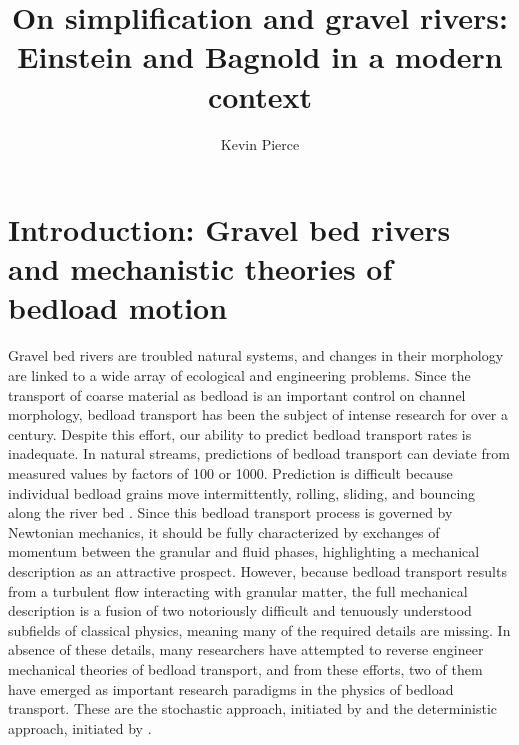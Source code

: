 \documentclass{article}
\begin{document}
\title{On simplification and gravel rivers: Einstein and Bagnold in a modern context}
\author{Kevin Pierce}
\maketitle


\section{Introduction: Gravel bed rivers and mechanistic theories of bedload motion}
Gravel bed rivers are troubled natural systems, and changes in their morphology are linked to a wide array of ecological and engineering problems.
Since the transport of coarse material as bedload is an important control on channel morphology, bedload transport has been the subject of intense research for over a century. 
Despite this effort, our ability to predict bedload transport rates is inadequate.  
In natural streams, predictions of bedload transport can deviate from measured values by factors of 100 or 1000. 
Prediction is difficult because individual bedload grains move intermittently, rolling, sliding, and bouncing along the river bed \citep{Einstein1950, Bagnold1973}. 
Since this bedload transport process is governed by Newtonian mechanics, it should be fully characterized by exchanges of momentum between the granular and fluid phases, highlighting a mechanical description as an attractive prospect.
However, because bedload transport results from a turbulent flow interacting with granular matter, the full mechanical description is a fusion of two notoriously difficult and tenuously understood subfields of classical physics, meaning many of the required details are missing.
In absence of these details, many researchers have attempted to reverse engineer mechanical theories of bedload transport, and from these efforts, two of them have emerged as important research paradigms in the physics of bedload transport. 
These are the stochastic approach, initiated by \citet{Einstein1937, Einstein1950, Einstein1964} and the deterministic approach, initiated by \citet{Bagnold1956, Bagnold1966, Bagnold1973}. 
\end{document}
